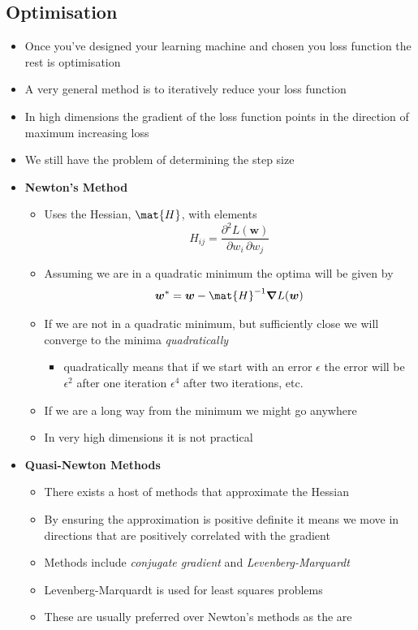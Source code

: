 \documentclass[11pt]{article}
\newcommand{\grad}{\bm{\nabla}}
\begin{document}
\subsection{Optimisation}
\label{sec:orga00631d}
\begin{itemize}
\item Once you've designed your learning machine and chosen you loss
function the rest is optimisation
\item A very general method is to iteratively reduce your loss function
\item In high dimensions the gradient of the loss function points in
the direction of maximum increasing loss
\item We still have the problem of determining the step size
\item \textbf{Newton's Method}
\begin{itemize}
\item Uses the Hessian, \(\mat{H}\), with elements
$$ H_{ij} = \frac{\partial^2 L(\bm{w})}{\partial w_i\,\partial w_j} $$
\item Assuming we are in a quadratic minimum the optima will be given by
$$ \bm{w}^* = \bm{w} - \mat{H}^{-1} \grad L(\bm{w}) $$
\item If we are not in a quadratic minimum, but sufficiently close we
will converge to the minima \emph{quadratically}
\begin{itemize}
\item quadratically means that if we start with an error \(\epsilon\)
the error will be \(\epsilon^2\) after one iteration
\(\epsilon^4\) after two iterations, etc.
\end{itemize}
\item If we are a long way from the minimum we might go anywhere
\item In very high dimensions it is not practical
\end{itemize}
\item \textbf{Quasi-Newton Methods}
\begin{itemize}
\item There exists a host of methods that approximate the Hessian
\item By ensuring the approximation is positive definite it means we
move in directions that are positively correlated with the gradient
\item Methods include \emph{conjugate gradient} and \emph{Levenberg-Marquardt}
\item Levenberg-Marquardt is used for least squares problems
\item These are usually preferred over Newton's methods as the are

\end{itemize}
\end{itemize}
\end{document}
